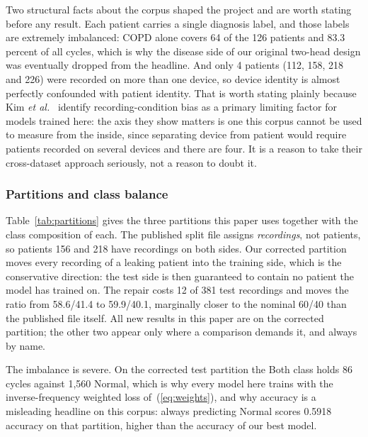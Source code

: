 \documentclass[journal,onecolumn]{IEEEtran}
\begin{document}
Two structural facts about the corpus shaped the project and are worth stating before any
result. Each patient carries a single diagnosis label, and those labels are extremely
imbalanced: COPD alone covers 64 of the 126 patients and 83.3 percent of all cycles, which is
why the disease side of our original two-head design was eventually dropped from the headline.
And only 4 patients (112, 158, 218 and 226) were recorded on more than one device, so device
identity is almost perfectly confounded with patient identity. That is worth stating plainly
because Kim \emph{et al.}~\cite{kim2025metadata} identify recording-condition bias as a
primary limiting factor for models trained here: the axis they show matters is one this corpus
cannot be used to measure from the inside, since separating device from patient would require
patients recorded on several devices and there are four. It is a reason to take their
cross-dataset approach seriously, not a reason to doubt it.

\subsubsection{Partitions and class balance}
Table~\ref{tab:partitions} gives the three partitions this paper uses together with the
class composition of each. The published split file assigns \emph{recordings}, not patients,
so patients 156 and 218 have recordings on both sides. Our corrected partition moves every
recording of a leaking patient into the training side, which is the conservative direction:
the test side is then guaranteed to contain no patient the model has trained on. The repair
costs 12 of 381 test recordings and moves the ratio from 58.6/41.4 to 59.9/40.1, marginally
closer to the nominal 60/40 than the published file itself. All new results in this paper
are on the corrected partition; the other two appear only where a comparison demands it, and
always by name.

The imbalance is severe. On the corrected test partition the Both class holds 86 cycles
against 1,560 Normal, which is why every model here trains with the inverse-frequency
weighted loss of~(\ref{eq:weights}), and why accuracy is a misleading headline on this
corpus: always predicting Normal scores 0.5918 accuracy on that partition, higher than the
accuracy of our best model.
\end{document}
